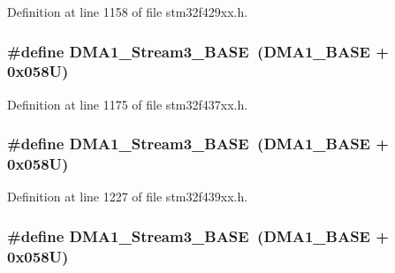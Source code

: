Definition at line 1158 of file stm32f429xx.\+h.

\subsubsection[{\texorpdfstring{D\+M\+A1\+\_\+\+Stream3\+\_\+\+B\+A\+SE}{DMA1_Stream3_BASE}}]{\setlength{\rightskip}{0pt plus 5cm}\#define D\+M\+A1\+\_\+\+Stream3\+\_\+\+B\+A\+SE~({\bf D\+M\+A1\+\_\+\+B\+A\+SE} + 0x058\+U)}\hypertarget{group___peripheral__memory__map_gac51deb54ff7cfe1290dfcf517ae67127}{}\label{group___peripheral__memory__map_gac51deb54ff7cfe1290dfcf517ae67127}


Definition at line 1175 of file stm32f437xx.\+h.

\subsubsection[{\texorpdfstring{D\+M\+A1\+\_\+\+Stream3\+\_\+\+B\+A\+SE}{DMA1_Stream3_BASE}}]{\setlength{\rightskip}{0pt plus 5cm}\#define D\+M\+A1\+\_\+\+Stream3\+\_\+\+B\+A\+SE~({\bf D\+M\+A1\+\_\+\+B\+A\+SE} + 0x058\+U)}\hypertarget{group___peripheral__memory__map_gac51deb54ff7cfe1290dfcf517ae67127}{}\label{group___peripheral__memory__map_gac51deb54ff7cfe1290dfcf517ae67127}


Definition at line 1227 of file stm32f439xx.\+h.

\subsubsection[{\texorpdfstring{D\+M\+A1\+\_\+\+Stream3\+\_\+\+B\+A\+SE}{DMA1_Stream3_BASE}}]{\setlength{\rightskip}{0pt plus 5cm}\#define D\+M\+A1\+\_\+\+Stream3\+\_\+\+B\+A\+SE~({\bf D\+M\+A1\+\_\+\+B\+A\+SE} + 0x058\+U)}\hypertarget{group___peripheral__memory__map_gac51deb54ff7cfe1290dfcf517ae67127}{}\label{group___peripheral__memory__map_gac51deb54ff7cfe1290dfcf517ae67127}


